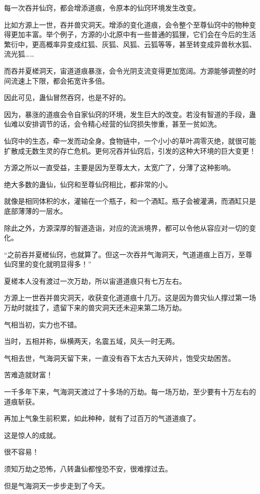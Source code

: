 \begin{this_body}
每一次吞并仙窍，都会增添道痕，令原本的仙窍环境发生改变。

比如方源上一世，吞并兽灾洞天。增添的变化道痕，会令整个至尊仙窍中的物种变得更加丰富。举个例子，方源的小北原中有一些普通的狐狸，它们会在今后的生活繁衍中，更高概率异变成红狐、灰狐、风狐、云狐等等，甚至转变成异兽秋水狐、流光狐……

而吞并夏槎洞天，宙道道痕暴涨，会令光阴支流变得更加宽阔。方源能够调整的时间流速上下限，都会拓宽许多倍。

因此可见，蛊仙冒然吞窍，也是不好的。

因为，暴涨的道痕会令自家仙窍的环境，发生巨大的改变。若没有智道的手段，蛊仙难以安排调节的话，会令精心经营的仙窍损失惨重，甚至一贫如洗。

仙窍中的生态，牵一发而动全身。食物链中，一个小小的草叶凋零灭绝，就很可能扩散成无数生灵的存亡危机。更何况吞并仙窍后，引发的这种大环境的巨大变更！

方源之所以一直受益，主要是因为至尊太大，太宽广了，分薄了这种影响。

绝大多数的蛊仙，仙窍和至尊仙窍相比，都非常的小。

就像是相同体积的水，灌输在一个瓶子，和一个酒缸。瓶子会被灌满，而酒缸只是底部薄薄的一层水。

除此之外，方源深厚的智道造诣，对应的流派境界，都可以令他从容应对一切的变化。

“之前吞并夏槎仙窍，也就算了。但这一次吞并气海洞天，气道道痕上百万，至尊仙窍里的变化就明显得多！”

夏槎本人没有渡过一次万劫，所以宙道道痕只有七万左右。

方源上一世吞并兽灾洞天，收获变化道道痕十几万。这是因为兽灾仙人撑过第一场万劫时就挂了，遗留下来的兽灾洞天还未迎来第二场万劫。

气相当初，实力也不错。

当时，五相并称，纵横两天，名震五域，风头一时无两。

气相去世，气海洞天留下来，一直没有吞下太古九天碎片，饱受灾劫困苦。

苦难造就财富！

一千多年下来，气海洞天渡过了十多场的万劫。每一场万劫，至少要有十万左右的道痕斩获。

再加上气象生前积累，如此种种，就有了过百万的气道道痕了。

这是惊人的成就。

很不容易！

须知万劫之恐怖，八转蛊仙都惶恐不安，很难撑过去。

但是气海洞天一步步走到了今天。


\end{this_body}

